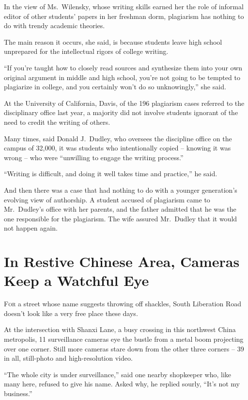 ﻿\documentclass[12pt]{article}
\begin{document}
In the view of Ms.~Wilensky, whose writing skills earned her the role of informal editor of other
students' papers in her freshman dorm, plagiarism has nothing to do with trendy academic theories.

The main reason it occurs, she said, is because students leave high school unprepared for the
intellectual rigors of college writing.

``If you're taught how to closely read sources and synthesize them into your own original argument
in middle and high school, you're not going to be tempted to plagiarize in college, and you
certainly won't do so unknowingly,'' she said.

At the University of California, Davis, of the 196 plagiarism cases referred to the disciplinary
office last year, a majority did not involve students ignorant of the need to credit the writing of
others.

Many times, said Donald J.~Dudley, who oversees the discipline office on the campus of 32,000, it
was students who intentionally copied -- knowing it was wrong -- who were ``unwilling to engage the
writing process.''

``Writing is difficult, and doing it well takes time and practice,'' he said.

And then there was a case that had nothing to do with a younger generation's evolving view of
authorship. A student accused of plagiarism came to Mr.~Dudley's office with her parents, and the
father admitted that he was the one responsible for the plagiarism. The wife assured Mr.~Dudley that
it would not happen again.

\section{In Restive Chinese Area, Cameras Keep a Watchful Eye}

\lettrine{F}{or} a street whose name suggests throwing off shackles, South
Liberation Road doesn't look like a very free place these days.

At the intersection with Shanxi Lane, a busy crossing in this northwest China metropolis, 11
surveillance cameras eye the bustle from a metal boom projecting over one corner. Still more cameras
stare down from the other three corners -- 39 in all, still-photo and high-resolution video.

``The whole city is under surveillance,'' said one nearby shopkeeper who, like many here, refused to
give his name. Asked why, he replied sourly, ``It's not my business.''
\end{document}
